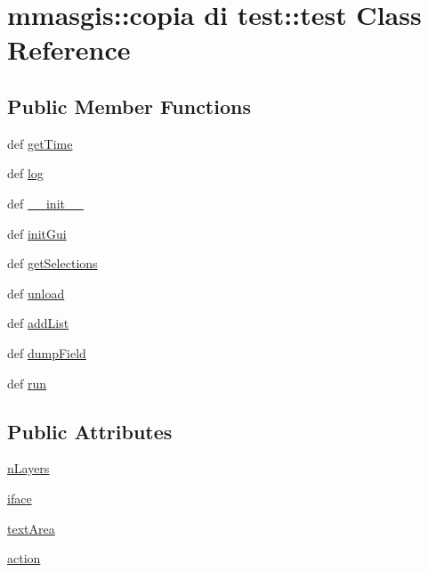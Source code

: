 \hypertarget{classmmasgis_1_1copia_01di_01test_1_1test}{
\section{mmasgis::copia di test::test Class Reference}
\label{classmmasgis_1_1copia_01di_01test_1_1test}
}
\subsection*{Public Member Functions}
\begin{DoxyCompactItemize}
\item 
def \hyperlink{classmmasgis_1_1copia_01di_01test_1_1test_a7ffbd60dd0adbb64096b23d2fdc380f2}{getTime}
\item 
def \hyperlink{classmmasgis_1_1copia_01di_01test_1_1test_a984157936025f75c0119eabfa354c0aa}{log}
\item 
def \hyperlink{classmmasgis_1_1copia_01di_01test_1_1test_a2eb0a791bee319030a648eaf52ba166c}{\_\-\_\-init\_\-\_\-}
\item 
def \hyperlink{classmmasgis_1_1copia_01di_01test_1_1test_a858783f4e015fb144eb89af1266bf2c1}{initGui}
\item 
def \hyperlink{classmmasgis_1_1copia_01di_01test_1_1test_af8e61318ed1b6fabb3bd7e097f37710a}{getSelections}
\item 
def \hyperlink{classmmasgis_1_1copia_01di_01test_1_1test_a0c81f06278207a6d645bc15f84a47cc4}{unload}
\item 
def \hyperlink{classmmasgis_1_1copia_01di_01test_1_1test_ab50448a5d06f6c70a1462ed96acb7dec}{addList}
\item 
def \hyperlink{classmmasgis_1_1copia_01di_01test_1_1test_a32e404fa910e1bc984e6d56c3c2db361}{dumpField}
\item 
def \hyperlink{classmmasgis_1_1copia_01di_01test_1_1test_a8a5fa5a4718dfd3628eff61ffeb83766}{run}
\end{DoxyCompactItemize}
\subsection*{Public Attributes}
\begin{DoxyCompactItemize}
\item 
\hyperlink{classmmasgis_1_1copia_01di_01test_1_1test_a5c5e5081e5f8e4855a29f4041a80ecb0}{nLayers}
\item 
\hyperlink{classmmasgis_1_1copia_01di_01test_1_1test_a12571a5aa22e9479430cdeb9f7f079bf}{iface}
\item 
\hyperlink{classmmasgis_1_1copia_01di_01test_1_1test_a791e0d36150ef988e043fd89195a588f}{textArea}
\item 
\hyperlink{classmmasgis_1_1copia_01di_01test_1_1test_a6846983849774a0e135f39a29c01314c}{action}
\end{DoxyCompactItemize}
